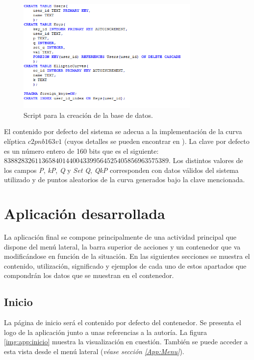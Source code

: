 \documentclass[../PFC.tex]{subfiles}
\begin{document}
\begin{figure}[H]
  \centering
  \includegraphics[width=0.8\textwidth]{./img/databaseScript}
  \caption{Script para la creación de la base de datos.}
  \label{img:databaseScript}
\end{figure}

El contenido por defecto del sistema se adecua a la implementación de la curva elíptica \(c2pnb163v1\) (cuyos detalles se pueden encontrar en \cite{definicionCurvasF2M}). La clave por defecto es un número entero de 160 bits que es el siguiente: \(838828326113658401440043399564525405856963575389\). Los distintos valores de los campos \textit{P}, \textit{kP}, \textit{Q} y \textit{Set Q}, \textit{QkP} corresponden con datos válidos del sistema utilizado y de puntos aleatorios de la curva generados bajo la clave mencionada.

\section{Aplicación desarrollada}
\label{App:Aplicación desarrollada}

La aplicación final se compone principalmente de una actividad principal que dispone del menú lateral, la barra superior de acciones y un contenedor que va modificándose en función de la situación. En las siguientes secciones se muestra el contenido, utilización, significado y ejemplos de cada uno de estos apartados que compondrán los datos que se muestran en el contenedor.

\subsection{Inicio}
\label{App:AD:Inicio}

La página de inicio será el contenido por defecto del contenedor. Se presenta el logo de la aplicación junto a unas referencias a la autoría. La figura \ref{img:app:inicio} muestra la visualización en cuestión. También se puede acceder a esta vista desde el menú lateral (\textit{véase sección \ref{App:Menu}}).
\end{document}
